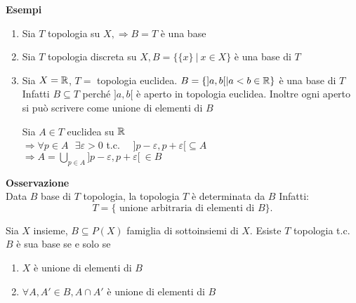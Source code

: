 \documentclass{article}
\begin{document}
\textbf{Esempi}
\begin{enumerate}
	\item Sia $T$ topologia su $X, \Rightarrow B=T$ è una base
	\item Sia $T$ topologia discreta su $X, B = \{\{x\} \ | \ x\in X\}$  è una base di $T$
	\item Sia  $X = \mathbb{R}$, $T = $ topologia euclidea. $B = \{]a,b[ | a < b \in \mathbb{R}\}$ è una base di  $T$\\
		Infatti  $B\subseteq T$ perché $]a,b[$ è aperto in topologia euclidea. Inoltre ogni aperto si può scrivere come unione di elementi di $B$\\
		 \begin{dimo}
			Sia $A\in T$ euclidea su $\mathbb{R}$\\
			$ \Rightarrow \forall p\in A\ \ \ \exists \varepsilon > 0 $ t.c. \ \ $]p-\varepsilon, p + \varepsilon[ \subseteq A$\\
			$ \Rightarrow A = \bigcup_{p\in A} ]p-\varepsilon, p + \varepsilon[\ \in B$
		\end{dimo}
\end{enumerate}
\textbf{Osservazione}\\
Data $B$ base di $T$ topologia, la topologia $T$ è determinata da $B$ Infatti:
\[
	T = \{\text { unione arbitraria di elementi di } B\}
.\] 
\begin{prop}
	Sia $X$ insieme, $B\subseteq P(X)$ famiglia di sottoinsiemi di  $X$. Esiste $T$ topologia t.c. $B$ è sua base se e solo se
	\begin{enumerate}
		\item $X$ è unione di elementi di $B$
		\item  $\forall A,A'\in B, A\cap A'$ è unione di elementi di $B$
	\end{enumerate}
\end{prop}
\end{document}
